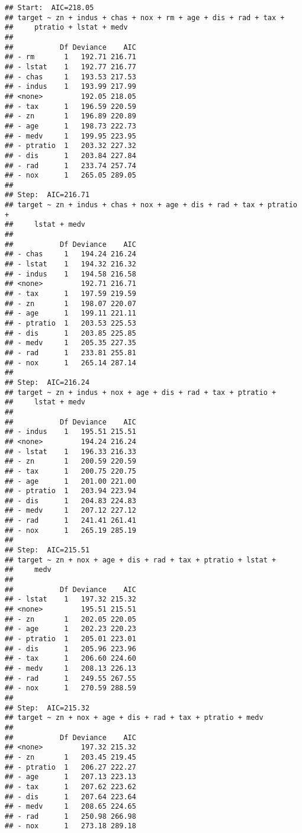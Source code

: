 \documentclass[
]{article}
\begin{document}
\begin{verbatim}
## Start:  AIC=218.05
## target ~ zn + indus + chas + nox + rm + age + dis + rad + tax + 
##     ptratio + lstat + medv
## 
##           Df Deviance    AIC
## - rm       1   192.71 216.71
## - lstat    1   192.77 216.77
## - chas     1   193.53 217.53
## - indus    1   193.99 217.99
## <none>         192.05 218.05
## - tax      1   196.59 220.59
## - zn       1   196.89 220.89
## - age      1   198.73 222.73
## - medv     1   199.95 223.95
## - ptratio  1   203.32 227.32
## - dis      1   203.84 227.84
## - rad      1   233.74 257.74
## - nox      1   265.05 289.05
## 
## Step:  AIC=216.71
## target ~ zn + indus + chas + nox + age + dis + rad + tax + ptratio + 
##     lstat + medv
## 
##           Df Deviance    AIC
## - chas     1   194.24 216.24
## - lstat    1   194.32 216.32
## - indus    1   194.58 216.58
## <none>         192.71 216.71
## - tax      1   197.59 219.59
## - zn       1   198.07 220.07
## - age      1   199.11 221.11
## - ptratio  1   203.53 225.53
## - dis      1   203.85 225.85
## - medv     1   205.35 227.35
## - rad      1   233.81 255.81
## - nox      1   265.14 287.14
## 
## Step:  AIC=216.24
## target ~ zn + indus + nox + age + dis + rad + tax + ptratio + 
##     lstat + medv
## 
##           Df Deviance    AIC
## - indus    1   195.51 215.51
## <none>         194.24 216.24
## - lstat    1   196.33 216.33
## - zn       1   200.59 220.59
## - tax      1   200.75 220.75
## - age      1   201.00 221.00
## - ptratio  1   203.94 223.94
## - dis      1   204.83 224.83
## - medv     1   207.12 227.12
## - rad      1   241.41 261.41
## - nox      1   265.19 285.19
## 
## Step:  AIC=215.51
## target ~ zn + nox + age + dis + rad + tax + ptratio + lstat + 
##     medv
## 
##           Df Deviance    AIC
## - lstat    1   197.32 215.32
## <none>         195.51 215.51
## - zn       1   202.05 220.05
## - age      1   202.23 220.23
## - ptratio  1   205.01 223.01
## - dis      1   205.96 223.96
## - tax      1   206.60 224.60
## - medv     1   208.13 226.13
## - rad      1   249.55 267.55
## - nox      1   270.59 288.59
## 
## Step:  AIC=215.32
## target ~ zn + nox + age + dis + rad + tax + ptratio + medv
## 
##           Df Deviance    AIC
## <none>         197.32 215.32
## - zn       1   203.45 219.45
## - ptratio  1   206.27 222.27
## - age      1   207.13 223.13
## - tax      1   207.62 223.62
## - dis      1   207.64 223.64
## - medv     1   208.65 224.65
## - rad      1   250.98 266.98
## - nox      1   273.18 289.18
\end{verbatim}
\end{document}
